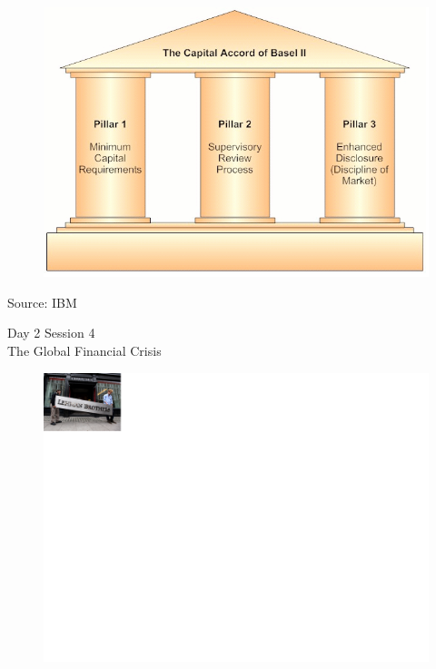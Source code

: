 \documentclass[11pt]{beamer}
\begin{document}
\begin{frame}
\begin{figure}
\includegraphics[width=1 \textwidth]{BaselII.png}
\end{figure}
\tiny{Source: IBM}
\end{frame}



\begin{frame}
\begin{center}
 Day 2 Session 4 \\
The Global Financial Crisis
\end{center}
\end{frame}


\begin{frame}
\begin{figure}
\includegraphics[]{Lehman.png}
\end{figure}
\end{frame}
\end{document}
